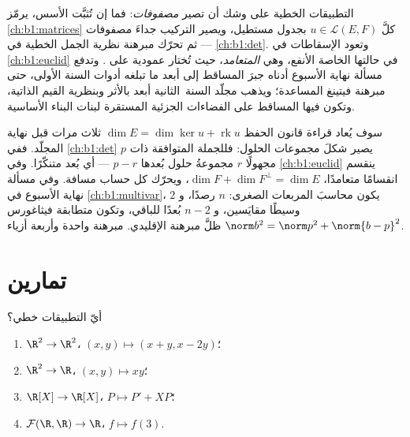 \begin{remark}
\label{rem:b1:linmaps:whereused}
التطبيقات الخطية على وشك أن تصير \emph{مصفوفات}: فما إن تُثبَّت الأسس،
يرمّز \cref{ch:b1:matrices} كلَّ $u \in \mathcal{L}(E,
F)$ بجدول مستطيل، ويصير التركيب جداءَ
مصفوفات --- ثم تحرّك مبرهنة  نظرية الجمل
الخطية في \cref{ch:b1:det}. وتعود الإسقاطات في
\cref{ch:b1:euclid} في حالتها الخاصة الأنفع، وهي
 \emph{المتعامد}، حيث تُختار 
عمودية على . وتدفع مسألة نهاية الأسبوع أدناه
جبرَ المساقط إلى أبعد ما تبلغه أدوات السنة الأولى، حتى مبرهنة
فيتينغ المساعدة؛ ويذهب مجلّد السنة~الثانية أبعد بالأثر
وبنظرية القيم الذاتية، وتكون فيها المساقط على الفضاءات الجزئية
المستقرة لبنات البناء الأساسية.
\end{remark}

\begin{remark}
\label{rem:b1:linmaps:perspectives}
سوف يُعاد قراءة قانون الحفظ $\dim E = \dim\ker u + \operatorname{rk} u$
ثلاث مرات قبل نهاية المجلّد. ففي
\cref{ch:b1:det} يصير شكلَ مجموعات الحلول: فللجملة
المتوافقة ذات $p$ مجهولًا  $r$ مجموعةُ حلول
بُعدها $p - r$ --- أي بُعد  متنكّرًا. وفي
\cref{ch:b1:euclid} ينقسم انقسامًا متعامدًا، $\dim F + \dim
F^\perp = \dim E$، ويحرّك كل حساب مسافة. وفي
مسألة نهاية الأسبوع في \cref{ch:b1:multivar}، يكون محاسبَ
المربعات الصغرى: $n$ رصدًا، و $2$ وسيطًا مقايَسين،
و $n - 2$ بُعدًا للباقي، وتكون متطابقة فيثاغورس $\norm b^2 = \norm p^2 + \norm{b - p}^2$ ظلَّ
مبرهنة  الإقليدي. مبرهنة واحدة وأربعة أزياء.
\end{remark}

\section{تمارين}

\begin{exercise}[$\star$]\label{exo:b1:linmaps:1}
أيّ التطبيقات خطي؟
\begin{enumerate}
  \item $\R^2 \to \R^2$، $(x, y) \mapsto (x + y, x - 2y)$؛
  \item $\R^2 \to \R$، $(x, y) \mapsto xy$؛
  \item $\R[X] \to \R[X]$، $P \mapsto P' + XP$؛
  \item $\mathcal{F}(\R,\R) \to \R$، $f \mapsto f(3)$.
\end{enumerate}
\end{exercise}

